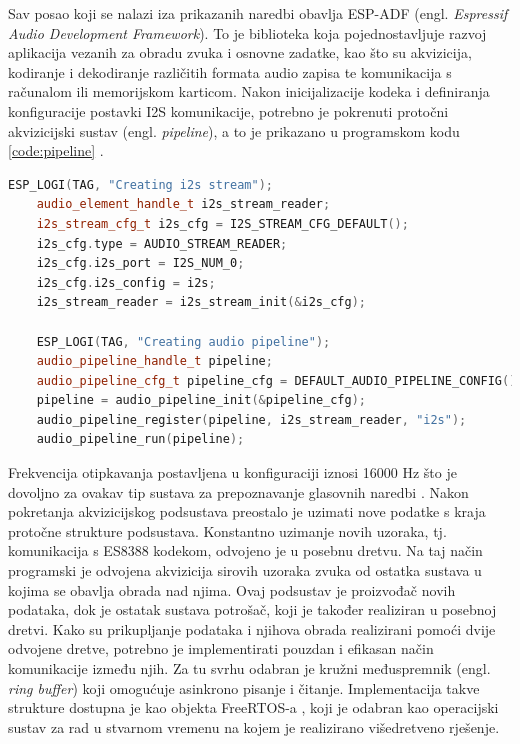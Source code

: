 Sav posao koji se nalazi iza prikazanih naredbi obavlja ESP-ADF
(engl. \textit{Espressif Audio Development Framework}). To je biblioteka koja pojednostavljuje
razvoj aplikacija vezanih za obradu zvuka i osnovne zadatke, kao što su akvizicija, kodiranje i 
dekodiranje različitih formata audio zapisa te komunikacija s računalom ili 
memorijskom karticom.
Nakon inicijalizacije kodeka i definiranja konfiguracije postavki I2S komunikacije,
potrebno je pokrenuti protočni akvizicijski sustav (engl. \textit{pipeline}), 
a to je prikazano u programskom kodu \ref{code:pipeline} .

\begin{lstlisting}[language=C++, caption=Pokretanje akvizicijskog sustava, label=code:pipeline]
    ESP_LOGI(TAG, "Creating i2s stream");
    audio_element_handle_t i2s_stream_reader;
    i2s_stream_cfg_t i2s_cfg = I2S_STREAM_CFG_DEFAULT();
    i2s_cfg.type = AUDIO_STREAM_READER;
    i2s_cfg.i2s_port = I2S_NUM_0;
    i2s_cfg.i2s_config = i2s;
    i2s_stream_reader = i2s_stream_init(&i2s_cfg);

    ESP_LOGI(TAG, "Creating audio pipeline");
    audio_pipeline_handle_t pipeline;
    audio_pipeline_cfg_t pipeline_cfg = DEFAULT_AUDIO_PIPELINE_CONFIG();
    pipeline = audio_pipeline_init(&pipeline_cfg);
    audio_pipeline_register(pipeline, i2s_stream_reader, "i2s");
    audio_pipeline_run(pipeline);
\end{lstlisting}

Frekvencija otipkavanja postavljena u konfiguraciji iznosi 16000 Hz što
je dovoljno za ovakav tip sustava za prepoznavanje glasovnih naredbi \cite{wardentinyml}.
Nakon pokretanja akvizicijskog podsustava preostalo je uzimati nove
podatke s kraja protočne strukture podsustava. Konstantno uzimanje novih uzoraka, tj. komunikacija
s ES8388 kodekom, odvojeno je u posebnu dretvu. Na taj način programski je 
odvojena akvizicija sirovih uzoraka zvuka od ostatka sustava u kojima se obavlja obrada nad njima. Ovaj podsustav je proizvođač novih podataka, dok je ostatak sustava potrošač, koji je također realiziran u posebnoj dretvi. Kako su prikupljanje podataka i njihova obrada realizirani pomoći dvije odvojene dretve, potrebno je implementirati pouzdan i efikasan način komunikacije između njih. Za tu svrhu odabran je
kružni međuspremnik (engl. \textit{ring buffer}) koji omogućuje asinkrono pisanje i čitanje. Implementacija takve strukture dostupna je kao objekta FreeRTOS-a 
\cite{ringbufferrr}, koji je odabran kao operacijski sustav za rad u stvarnom vremenu na kojem je realizirano višedretveno rješenje. 


